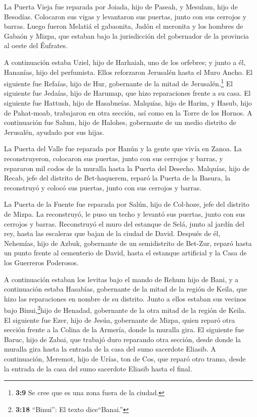  La Puerta Vieja fue reparada por Joiada, hijo de Paseah, y
Mesulam, hijo de Besodías. Colocaron sus vigas y levantaron sus puertas,
junto con sus cerrojos y barras.  Luego fueron Melatiá el
gabaonita, Jadón el meronita y los hombres de Gabaón y Mizpa, que
estaban bajo la jurisdicción del gobernador de la provincia al oeste del
Éufrates.

 A continuación estaba Uziel, hijo de Harhaiah, uno de los
orfebres; y junto a él, Hananías, hijo del perfumista. Ellos reforzaron
Jerusalén hasta el Muro Ancho.  El siguiente fue Refaías,
hijo de Hur, gobernante de la mitad de Jerusalén.\footnote{\textbf{3:9}
  Se cree que es una zona fuera de la ciudad.}  El
siguiente fue Jedaías, hijo de Harumap, que hizo reparaciones frente a
su casa. El siguiente fue Hattush, hijo de Hasabneías. 
Malquías, hijo de Harim, y Hasub, hijo de Pahat-moab, trabajaron en otra
sección, así como en la Torre de los Hornos.  A
continuación fue Salum, hijo de Halohes, gobernante de un medio distrito
de Jerusalén, ayudado por sus hijas.

 La Puerta del Valle fue reparada por Hanún y la gente que
vivía en Zanoa. La reconstruyeron, colocaron sus puertas, junto con sus
cerrojos y barras, y repararon mil codos de la muralla hasta la Puerta
del Desecho.  Malquías, hijo de Recab, jefe del distrito de
Bet-haquerem, reparó la Puerta de la Basura, la reconstruyó y colocó sus
puertas, junto con sus cerrojos y barras.

 La Puerta de la Fuente fue reparada por Salún, hijo de
Col-hoze, jefe del distrito de Mizpa. La reconstruyó, le puso un techo y
levantó sus puertas, junto con sus cerrojos y barras. Reconstruyó el
muro del estanque de Selá, junto al jardín del rey, hasta las escaleras
que bajan de la ciudad de David.  Después de él, Nehemías,
hijo de Azbuk, gobernante de un semidistrito de Bet-Zur, reparó hasta un
punto frente al cementerio de David, hasta el estanque artificial y la
Casa de los Guerreros Poderosos.

 A continuación estaban los levitas bajo el mando de Rehum
hijo de Bani, y a continuación estaba Hasabías, gobernante de la mitad
de la región de Keila, que hizo las reparaciones en nombre de su
distrito.  Junto a ellos estaban sus vecinos bajo
Binui,\footnote{\textbf{3:18} ``Binui'': El texto dice``Banai.''}hijo de
Henadad, gobernante de la otra mitad de la región de Keila.
 El siguiente fue Ezer, hijo de Jesúa, gobernante de Mizpa,
quien reparó otra sección frente a la Colina de la Armería, donde la
muralla gira.  El siguiente fue Baruc, hijo de Zabai, que
trabajó duro reparando otra sección, desde donde la muralla gira hasta
la entrada de la casa del sumo sacerdote Eliasib.  A
continuación, Meremot, hijo de Urías, ton de Cos, que reparó otro tramo,
desde la entrada de la casa del sumo sacerdote Eliasib hasta el final.

